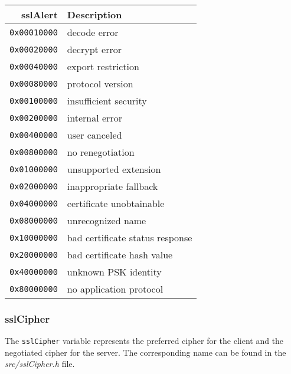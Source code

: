 \documentclass[documentation]{subfiles}
\begin{document}
\begin{minipage}{0.48\textwidth}
    \begin{longtable}{rl}
        \toprule
        {\bf sslAlert} & {\bf Description} \\
        \midrule\endhead%
        {\tt 0x00010000} & decode error\\
        {\tt 0x00020000} & decrypt error\\
        {\tt 0x00040000} & export restriction\\
        {\tt 0x00080000} & protocol version\\
        {\tt 0x00100000} & insufficient security\\
        {\tt 0x00200000} & internal error\\
        {\tt 0x00400000} & user canceled\\
        {\tt 0x00800000} & no renegotiation\\
        {\tt 0x01000000} & unsupported extension\\
        {\tt 0x02000000} & inappropriate fallback\\
        {\tt 0x04000000} & certificate unobtainable\\
        {\tt 0x08000000} & unrecognized name\\
        {\tt 0x10000000} & bad certificate status response\\
        {\tt 0x20000000} & bad certificate hash value\\
        {\tt 0x40000000} & unknown PSK identity\\
        {\tt 0x80000000} & no application protocol\\
        \bottomrule
    \end{longtable}
\end{minipage}

\subsubsection{sslCipher}\label{sslCipher}
The {\tt sslCipher} variable represents the preferred cipher for the client and the negotiated cipher for the server. The corresponding name can be found in the {\em src/sslCipher.h} file.\\
\end{document}
